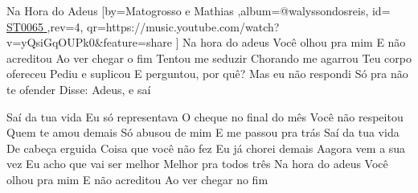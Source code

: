 \beginsong
{Na Hora do Adeus %
}[by={Matogrosso e Mathias %
},album={@walyssondosreis},
id={\href{https://music.youtube.com/watch?v=yQsiGqOUPk0&feature=share %
}{ ST0065 %
}},rev={4}, %
qr={https://music.youtube.com/watch?v=yQsiGqOUPk0&feature=share %
}]
\beginverse 
 Na hora do adeus 
Você olhou pra mim
E não acreditou 
Ao ver chegar o fim 
Tentou me seduzir 
Chorando me agarrou
 Teu corpo ofereceu 
Pediu e suplicou 
\endverse
\beginverse 
E perguntou, por quê? 
Mas eu não respondi
 Só pra não te ofender
Disse: Adeus, e saí 
\endverse

\beginchorus
Saí da tua vida
Eu só representava
O cheque no final do mês
Você não respeitou 
Quem te amou demais
Só abusou de mim 
E me passou pra trás 
Saí da tua vida 
De cabeça erguida
Coisa que você não fez
Eu já chorei demais
Aagora vem a sua vez
Eu acho que vai ser melhor
Melhor pra todos três
\endchorus
{}
\beginverse
Na hora do adeus
Você olhou pra mim
E não acreditou 
Ao ver chegar no fim
\endverse

\vspace{4em} %
\begin{comment}
\lstset{basicstyle=\scriptsize\bf} %
\tab{Solo 1}
\begin{lstlisting}
E|-----------------------------------------------------|
B|-----------------------------------------------------|
G|-----------------------------------------------------|
D|-----------------------------------------------------|
A|-----------------------------------------------------|
E|-----------------------------------------------------|
\end{lstlisting}
\end{comment}
\begin{comment}
\color{drawChord}\gtab{\color{nameChord} X1}{}%
\color{drawChord}\gtab{\color{nameChord} X2}{}%
\color{drawChord}\gtab{\color{nameChord} X3V2V7}{}%
\color{drawChord}\gtab{\color{nameChord} X5V7}{}%
\color{drawChord}\gtab{\color{nameChord} X6}{}%
\color{drawChord}\gtab{\color{nameChord} X6V2V7}{}%
\end{comment}

